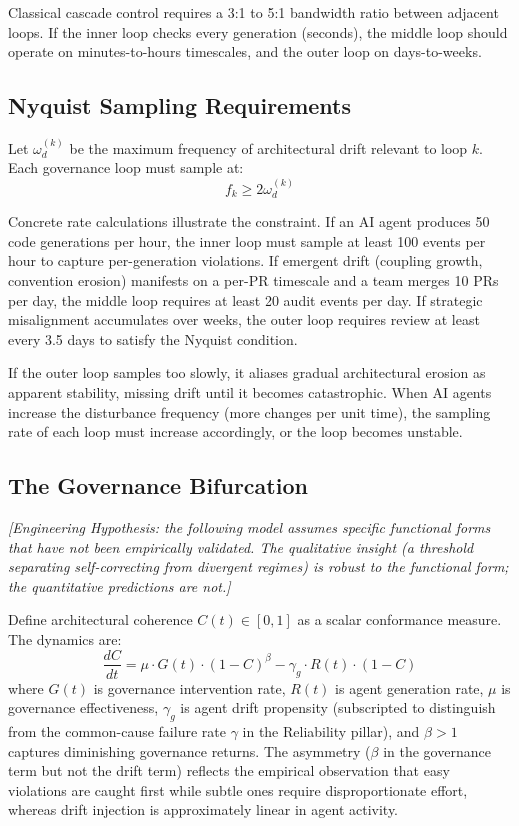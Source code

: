 \documentclass[11pt, a4paper, logo, copyright]{googledeepmind}
\begin{document}
Classical cascade control requires a 3:1 to 5:1 bandwidth ratio between adjacent loops. If the inner loop checks every generation (seconds), the middle loop should operate on minutes-to-hours timescales, and the outer loop on days-to-weeks.

\subsection{Nyquist Sampling Requirements}

Let $\omega_d^{(k)}$ be the maximum frequency of architectural drift relevant to loop $k$. Each governance loop must sample at:
\begin{equation}
    f_k \geq 2\omega_d^{(k)}
\end{equation}

Concrete rate calculations illustrate the constraint. If an AI agent produces 50 code generations per hour, the inner loop must sample at least 100 events per hour to capture per-generation violations. If emergent drift (coupling growth, convention erosion) manifests on a per-PR timescale and a team merges 10 PRs per day, the middle loop requires at least 20 audit events per day. If strategic misalignment accumulates over weeks, the outer loop requires review at least every 3.5 days to satisfy the Nyquist condition.

If the outer loop samples too slowly, it aliases gradual architectural erosion as apparent stability, missing drift until it becomes catastrophic. When AI agents increase the disturbance frequency (more changes per unit time), the sampling rate of each loop must increase accordingly, or the loop becomes unstable.

\subsection{The Governance Bifurcation}

\emph{[Engineering Hypothesis: the following model assumes specific functional forms that have not been empirically validated. The qualitative insight (a threshold separating self-correcting from divergent regimes) is robust to the functional form; the quantitative predictions are not.]}

Define architectural coherence $C(t) \in [0,1]$ as a scalar conformance measure. The dynamics are:
\begin{equation}
    \frac{dC}{dt} = \mu \cdot G(t) \cdot (1 - C)^\beta - \gamma_g \cdot R(t) \cdot (1 - C)
\end{equation}
where $G(t)$ is governance intervention rate, $R(t)$ is agent generation rate, $\mu$ is governance effectiveness, $\gamma_g$ is agent drift propensity (subscripted to distinguish from the common-cause failure rate $\gamma$ in the Reliability pillar), and $\beta > 1$ captures diminishing governance returns. The asymmetry ($\beta$ in the governance term but not the drift term) reflects the empirical observation that easy violations are caught first while subtle ones require disproportionate effort, whereas drift injection is approximately linear in agent activity.
\end{document}
